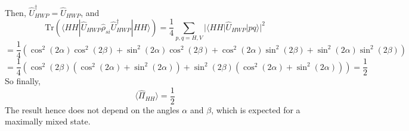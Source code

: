 \documentclass[a4paper, 12pt,oneside]{article}
\begin{document}
Then, $\hat{U}_{HWP}^\dagger = \hat{U}_{HWP}$, and 
\begin{equation}
    \text{Tr}(\langle HH|\hat{U}_{HWP} \hat{\rho}_{si} \hat{U}_{HWP}^\dagger |HH\rangle) = \frac{1}{4} \sum_{p,q = H,V} |\langle HH|\hat{U}_{HWP}|pq\rangle|^2
\end{equation}
\begin{equation}
    = \frac{1}{4} \left( \cos^2(2\alpha)\cos^2(2\beta) + \sin^2(2\alpha)\cos^2(2\beta) + \cos^2(2\alpha)\sin^2(2\beta) + \sin^2(2\alpha)\sin^2(2\beta) \right) 
\end{equation}
\begin{equation} 
    = \frac{1}{4} \left( \cos^2(2\beta)(\cos^2(2\alpha) + \sin^2(2\alpha)) + \sin^2(2\beta)(\cos^2(2\alpha) + \sin^2(2\alpha)) \right) = \frac{1}{2}
\end{equation}
So finally, 
\begin{equation}
    \langle \hat{\Pi}_{HH} \rangle = \frac{1}{2}
\end{equation}
The result hence does not depend on the angles $\alpha$ and $\beta$, which is expected for a maximally mixed state. 
\end{document}
